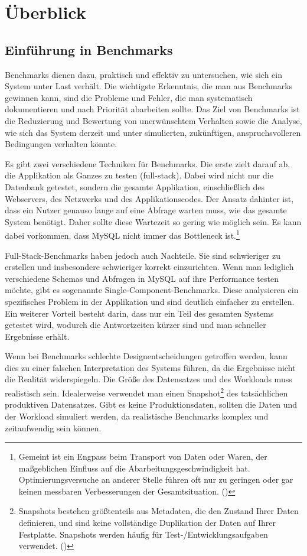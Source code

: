 

\chapter{Überblick}


\section{Einführung in Benchmarks}

Benchmarks dienen dazu, praktisch und effektiv zu untersuchen, wie sich ein
System unter Last verhält. Die wichtigste Erkenntnis, die man aus Benchmarks
gewinnen kann, sind die Probleme und Fehler, die man systematisch dokumentieren
und nach Priorität abarbeiten sollte. Das Ziel von Benchmarks ist die Reduzierung
und Bewertung von unerwünschtem Verhalten sowie die Analyse, wie sich das
System derzeit und unter simulierten, zukünftigen, anspruchsvolleren Bedingungen
verhalten könnte.

Es gibt zwei verschiedene Techniken für Benchmarks. Die erste zielt darauf ab,
die Applikation als Ganzes zu testen (full-stack). Dabei wird nicht nur die
Datenbank getestet, sondern die gesamte Applikation, einschließlich des Webservers,
des Netzwerks und des Applikationscodes. Der Ansatz dahinter ist, dass ein Nutzer
genauso lange auf eine Abfrage warten muss, wie das gesamte System benötigt.
Daher sollte diese Wartezeit so gering wie möglich sein. Es kann dabei vorkommen,
dass MySQL nicht immer das Bottleneck ist.\footnote{Gemeint ist ein Engpass beim Transport von Daten oder Waren, der maßgeblichen Einfluss auf die Abarbeitungsgeschwindigkeit hat. Optimierungsversuche an anderer Stelle führen oft nur zu geringen oder gar keinen messbaren Verbesserungen der Gesamtsituation. (\cite{bottleneck})}

Full-Stack-Benchmarks haben jedoch auch Nachteile. Sie sind schwieriger zu erstellen
und insbesondere schwieriger korrekt einzurichten. Wenn man lediglich verschiedene
Schemas und Abfragen in MySQL auf ihre Performance testen möchte, gibt es sogenannte
Single-Component-Benchmarks. Diese analysieren ein spezifisches Problem in der
Applikation und sind deutlich einfacher zu erstellen. Ein weiterer Vorteil besteht
darin, dass nur ein Teil des gesamten Systems getestet wird, wodurch die Antwortzeiten
kürzer sind und man schneller Ergebnisse erhält.

Wenn bei Benchmarks schlechte Designentscheidungen getroffen werden, kann dies zu einer
falschen Interpretation des Systems führen, da die Ergebnisse nicht die Realität widerspiegeln.
Die Größe des Datensatzes und des Workloads muss realistisch sein. Idealerweise verwendet
man einen Snapshot\footnote{Snapshots bestehen größtenteils aus Metadaten, die den Zustand Ihrer Daten definieren, und sind keine vollständige Duplikation der Daten auf Ihrer Festplatte. Snapshots werden häufig für Test-/Entwicklungsaufgaben verwendet. (\cite{snapshot}) } des tatsächlichen produktiven Datensatzes.
Gibt es keine Produktionsdaten, sollten die Daten und der Workload simuliert werden,
da realistische Benchmarks komplex und zeitaufwendig sein können.

